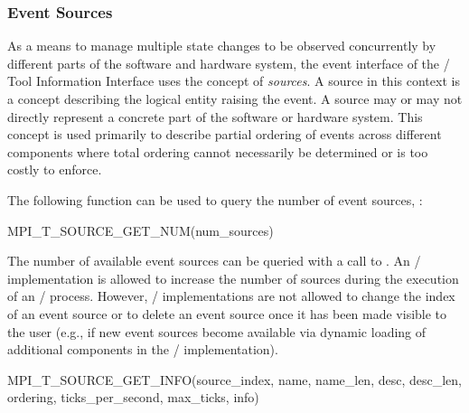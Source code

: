 \subsubsection{Event Sources}
\label{sec:tools:sources}

As a means to manage multiple state changes to be observed concurrently by
different parts of the software and hardware system, the event interface of
the \MPI/ Tool Information Interface uses the concept of \emph{sources}.  A
source in this context is a concept describing the logical entity raising
the event. A source may or may not directly represent a concrete part of
the software or hardware system. This concept is used primarily to describe
partial ordering of events across different components where total ordering
cannot necessarily be determined or is too costly to enforce. 

The following function can be used to query the number of event sources, :

\begin{funcdef}{MPI\_T\_SOURCE\_GET\_NUM}{(\mbox{num\_sources})}
\end{funcdef}

The number of available event sources can be queried with a call to
.  An \MPI/ implementation is allowed to
increase the number of sources during the execution of an \MPI/ process.
However, \MPI/ implementations are not allowed to change the index of an
event source or to delete an event source once it has been made visible to
the user (e.g., if new event sources become available via dynamic loading
of additional components in the \MPI/ implementation).

\begin{funcdef}{MPI\_T\_SOURCE\_GET\_INFO}{(\mbox{source\_index}, \mbox{name}, \mbox{name\_len}, \mbox{desc}, \mbox{desc\_len}, \mbox{ordering}, \mbox{ticks\_per\_second}, \mbox{max\_ticks}, \mbox{info})}
\end{funcdef}

